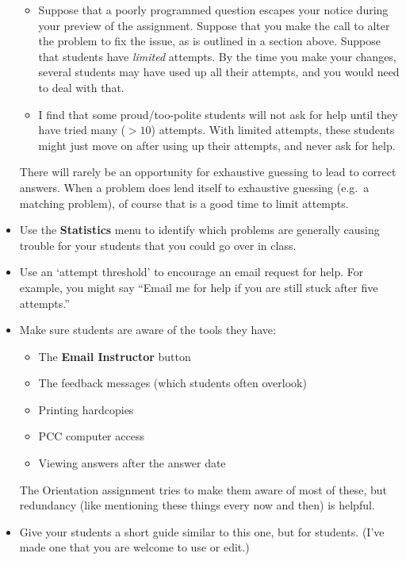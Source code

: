 \documentclass[12pt]{article}
\newcommand{\menu}[1]{\textbf{#1}}
\begin{document}
\begin{itemize}
\begin{itemize}
\item Suppose that a poorly programmed question escapes your notice during your preview of the assignment.  Suppose that you make the call to alter the problem to fix the issue, as is outlined in a section above.  Suppose that students have \emph{limited} attempts.  By the time you make your changes, several students may have used up all their attempts, and you would need to deal with that.

\item I find that some proud/too-polite students will not ask for help until they have tried many ($>\!\!10$) attempts.   With limited attempts, these students might just move on after using up their attempts, and never ask for help.

\end{itemize}

There will rarely be an opportunity for exhaustive guessing to lead to correct answers.  When a problem does lend itself to exhaustive guessing (e.g.\ a matching problem), of course that is a good time to limit attempts.

\item Use the \menu{Statistics} menu to identify which problems are generally causing trouble for your students that you could go over in class.

\item Use an `attempt threshold' to encourage an email request for help.  For example, you might say ``Email me for help if you are still stuck after five attempts.''

\item Make sure students are aware of the tools they have:
\begin{itemize}
\item The \menu{Email Instructor} button
\item The feedback messages (which students often overlook)
\item Printing hardcopies
\item PCC computer access
\item Viewing answers after the answer date
\end{itemize}
The Orientation assignment tries to make them aware of most of these, but redundancy (like mentioning these things every now and then) is helpful.

\item Give your students a short guide similar to this one, but for students.  (I've made one that you are welcome to use or edit.)  


\end{itemize}
\end{document}
